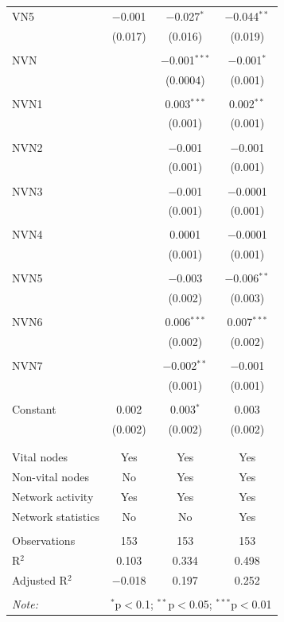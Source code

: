 \begin{table}[!htbp]
\begin{tabular}{@{\extracolsep{5pt}}lccc}
 VN5 & $-$0.001 & $-$0.027$^{*}$ & $-$0.044$^{**}$ \\ 
  & (0.017) & (0.016) & (0.019) \\ 
  & & & \\ 
 NVN &  & $-$0.001$^{***}$ & $-$0.001$^{*}$ \\ 
  &  & (0.0004) & (0.001) \\ 
  & & & \\ 
 NVN1 &  & 0.003$^{***}$ & 0.002$^{**}$ \\ 
  &  & (0.001) & (0.001) \\ 
  & & & \\ 
 NVN2 &  & $-$0.001 & $-$0.001 \\ 
  &  & (0.001) & (0.001) \\ 
  & & & \\ 
 NVN3 &  & $-$0.001 & $-$0.0001 \\ 
  &  & (0.001) & (0.001) \\ 
  & & & \\ 
 NVN4 &  & 0.0001 & $-$0.0001 \\ 
  &  & (0.001) & (0.001) \\ 
  & & & \\ 
 NVN5 &  & $-$0.003 & $-$0.006$^{**}$ \\ 
  &  & (0.002) & (0.003) \\ 
  & & & \\ 
 NVN6 &  & 0.006$^{***}$ & 0.007$^{***}$ \\ 
  &  & (0.002) & (0.002) \\ 
  & & & \\ 
 NVN7 &  & $-$0.002$^{**}$ & $-$0.001 \\ 
  &  & (0.001) & (0.001) \\ 
  & & & \\ 
 Constant & 0.002 & 0.003$^{*}$ & 0.003 \\ 
  & (0.002) & (0.002) & (0.002) \\ 
  & & & \\ 
\hline \\[-1.8ex] 
Vital nodes & Yes & Yes & Yes \\ 
Non-vital nodes & No & Yes & Yes \\ 
Network activity & Yes & Yes & Yes \\ 
Network statistics & No & No & Yes \\ 
\hline &  &  &  \\ 
Observations & 153 & 153 & 153 \\ 
R$^{2}$ & 0.103 & 0.334 & 0.498 \\ 
Adjusted R$^{2}$ & $-$0.018 & 0.197 & 0.252 \\ 
\hline 
\hline \\[-1.8ex] 
\textit{Note:}  & \multicolumn{3}{r}{$^{*}$p$<$0.1; $^{**}$p$<$0.05; $^{***}$p$<$0.01} \\ 
\end{tabular} 
\end{table} 
